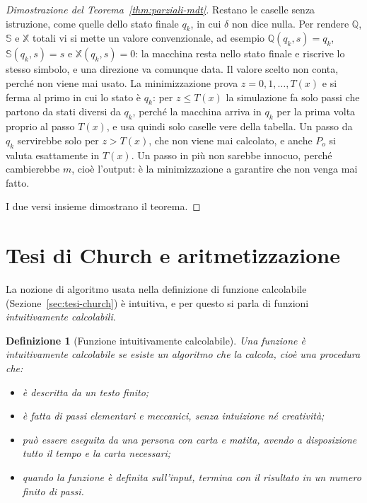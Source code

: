 \documentclass[a4paper, 11pt, oneside]{book}
\theoremstyle{formale}
\newtheorem*{definition}{Definizione}
\begin{document}
\begin{proof}[Dimostrazione del Teorema~\ref{thm:parziali-mdt}]
        Restano le caselle senza istruzione, come quelle dello stato finale $q_k$, in cui
        $\delta$ non dice nulla. Per rendere $\mathbb{Q}$, $\mathbb{S}$ e $\mathbb{X}$
        totali vi si mette un valore convenzionale, ad esempio $\mathbb{Q}(q_k, s) = q_k$,
        $\mathbb{S}(q_k, s) = s$ e $\mathbb{X}(q_k, s) = 0$: la macchina resta nello stato
        finale e riscrive lo stesso simbolo, e una direzione va comunque data. Il valore
        scelto non conta, perch\'e non viene mai usato. La minimizzazione prova
        $z = 0, 1, \dots, T(x)$ e si ferma al primo in cui lo stato \`e $q_k$: per
        $z \leq T(x)$ la simulazione fa solo passi che partono da stati diversi da $q_k$,
        perch\'e la macchina arriva in $q_k$ per la prima volta proprio al passo $T(x)$, e
        usa quindi solo caselle vere della tabella. Un passo da $q_k$ servirebbe solo per
        $z > T(x)$, che non viene mai calcolato, e anche $P_o$ si valuta esattamente in
        $T(x)$. Un passo in pi\`u non sarebbe innocuo, perch\'e cambierebbe $m$, cio\`e
        l'output: \`e la minimizzazione a garantire che non venga mai fatto.

        I due versi insieme dimostrano il teorema.
    \end{proof}

    \section{Tesi di Church e aritmetizzazione}
    \label{sec:church-aritmetizzazione}
    La nozione di algoritmo usata nella definizione di funzione calcolabile
    (Sezione~\ref{sec:tesi-church}) \`e intuitiva, e per questo si parla di funzioni
    \emph{intuitivamente calcolabili}.

    \begin{definition}[Funzione intuitivamente calcolabile]
        Una funzione \`e \emph{intuitivamente calcolabile} se esiste un algoritmo che la
        calcola, cio\`e una procedura che:
        \begin{itemize}
            \item \`e descritta da un testo finito;
            \item \`e fatta di passi elementari e meccanici, senza intuizione n\'e
                creativit\`a;
            \item pu\`o essere eseguita da una persona con carta e matita, avendo a
                disposizione tutto il tempo e la carta necessari;
            \item quando la funzione \`e definita sull'input, termina con il risultato in
                un numero finito di passi.
        \end{itemize}
    \end{definition}
\end{document}
